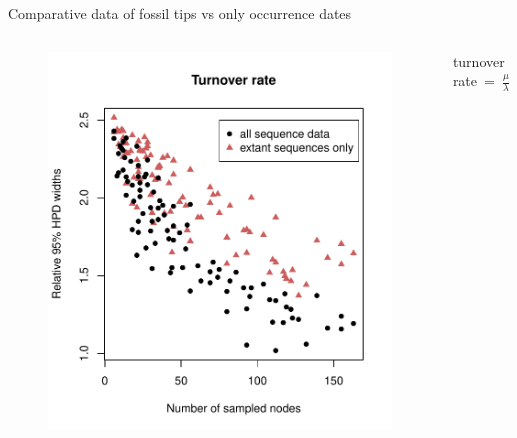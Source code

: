 

\begin{frame}{Comparative data of fossil tips vs only occurrence dates}

\setlength{\oddsidemargin}{0.1in} %

\begin{columns}[c]

\begin{column}{.7\textwidth}
\begin{center}
\begin{figure}
\includegraphics[height=0.65\textheight]{pics/TurnoverHPD/Rplots.pdf}
\end{figure}
\end{center}
 \end{column}
 
\begin{column}{.3\textwidth}
\begin{center}
turnover~rate~=~$\frac \mu \lambda$ 
\end{center}
 \end{column}    
\end{columns}

\end{frame}


